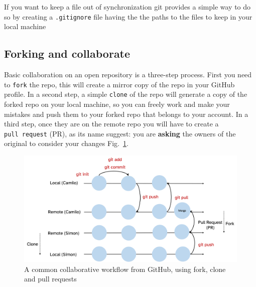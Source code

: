 \documentclass[
  letterpaper,
  DIV=11,
  numbers=noendperiod,
  oneside]{scrreprt}
\begin{document}
\begin{tcolorbox}[enhanced jigsaw, opacityback=0, leftrule=.75mm, breakable, titlerule=0mm, toprule=.15mm, rightrule=.15mm, title=\textcolor{quarto-callout-tip-color}{\faLightbulb}\hspace{0.5em}{Tip}, colback=white, opacitybacktitle=0.6, toptitle=1mm, bottomtitle=1mm, colframe=quarto-callout-tip-color-frame, colbacktitle=quarto-callout-tip-color!10!white, arc=.35mm, coltitle=black, bottomrule=.15mm, left=2mm]
If you want to keep a file out of synchronization git provides a simple
way to do so by creating a \texttt{.gitignore} file having the the paths
to the files to keep in your local machine
\end{tcolorbox}

\hypertarget{forking-and-collaborate}{%
\subsection{Forking and collaborate}\label{forking-and-collaborate}}

Basic collaboration on an open repository is a three-step process. First
you need to \texttt{fork} the repo, this will create a mirror copy of
the repo in your GitHub profile. In a second step, a simple
\texttt{clone} of the repo will generate a copy of the forked repo on
your local machine, so you can freely work and make your mistakes and
push them to your forked repo that belongs to your account. In a third
step, once they are on the remote repo you will have to create a
\texttt{pull\ request} (PR), as its name suggest: you are
\textbf{asking} the owners of the original to consider your changes
Fig.~\ref{fig-forking}.

\begin{figure}

{\centering \includegraphics{chs-command-line/imgs-cli/gitforking.png}

}

\caption{\label{fig-forking}A common collaborative workflow from GitHub,
using fork, clone and pull requests}

\end{figure}
\end{document}
